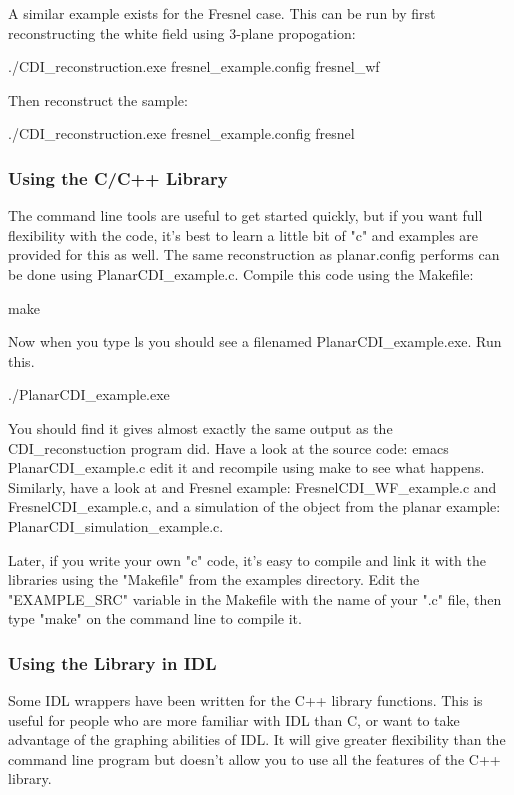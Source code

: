 \documentclass[]{cxs-software}
\begin{document}
A similar example exists for the Fresnel case. This can be run by
first reconstructing the white field using 3-plane propogation:
\begin{myverbatim}
   ./CDI_reconstruction.exe fresnel_example.config fresnel_wf 
\end{myverbatim}
Then reconstruct the sample: 
\begin{myverbatim}
   ./CDI_reconstruction.exe fresnel_example.config fresnel
\end{myverbatim}

\subsubsection{Using the C/C++ Library}

The command line tools are useful to get started quickly, but if you
want full flexibility with the code, it's best to learn a little bit
of "c" and examples are provided for this as well. The same
reconstruction as planar.config performs can be done using
PlanarCDI\_example.c. Compile this code using the Makefile: 
\begin{myverbatim}
   make 
\end{myverbatim}
Now when you type ls you should see a filenamed PlanarCDI\_example.exe. Run this.
\begin{myverbatim}
   ./PlanarCDI_example.exe 
\end{myverbatim}
You should find it gives almost exactly the same output as the
CDI\_reconstuction program did. Have a look at the source code: emacs
PlanarCDI\_example.c edit it and recompile using make to see what
happens. Similarly, have a look at and Fresnel example:
FresnelCDI\_WF\_example.c and FresnelCDI\_example.c, and a simulation of
the object from the planar example: PlanarCDI\_simulation\_example.c.

Later, if you write your own "c" code, it's easy to compile and link
it with the libraries using the "Makefile" from the examples
directory. Edit the "EXAMPLE\_SRC" variable in the Makefile with the
name of your ".c" file, then type "make" on the command line to
compile it.

\subsubsection{Using the Library in IDL}

Some IDL wrappers have been written for the C++ library
functions. This is useful for people who are more familiar with IDL
than C, or want to take advantage of the graphing abilities of IDL.
It will give greater flexibility than the command line program but
doesn't allow you to use all the features of the C++ library.
\end{document}
